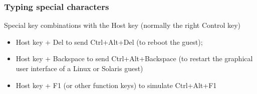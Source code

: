 \begin{frame}
\frametitle{Typing special characters}

Special key combinations with the \alert{Host key} (normally the right Control key) 
\begin{itemize}
\item \alert{Host key + Del} to send Ctrl+Alt+Del (to reboot the guest);
\item \alert{Host key + Backspace} to send Ctrl+Alt+Backspace (to restart the graphical user interface of a Linux or Solaris guest) 
\item \alert{Host key + F1} (or other function keys) to simulate Ctrl+Alt+F1
\end{itemize}
\end{frame}

